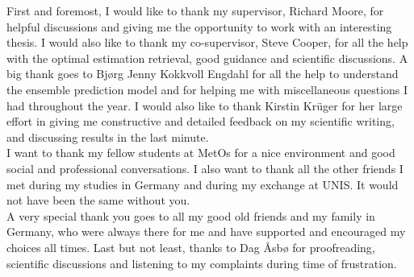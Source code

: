 
\begin{acknowledgement}   
	\noindent
	First and foremost, I would like to thank my supervisor, Richard Moore, for helpful discussions %
	and giving me the opportunity to work with an interesting thesis. I would also like to thank my co-supervisor, Steve Cooper, for all the help with the optimal estimation retrieval, %
	good guidance and scientific discussions. A big thank goes to Bj\o rg Jenny Kokkvoll Engdahl for all the help to understand the ensemble prediction model and for helping me with miscellaneous questions I had throughout the year. I would also like to thank Kirstin Kr\"uger for her large effort in giving me constructive and detailed feedback on my scientific writing, and discussing results in the last minute. 
	\\
	I want to thank my fellow students at MetOs for a nice environment and good social and professional conversations. I also want to thank all the other friends I met during my studies in Germany and during my exchange at UNIS. %
	It would not have been the same without you. %
	\\
	A very special thank you goes to all my good old friends and my family in Germany, who were always there for me and have supported and encouraged my choices all times. Last but not least, thanks to Dag \AA sb{\o} for proofreading, scientific discussions and listening to my complaints during time of frustration.
\end{acknowledgement}

